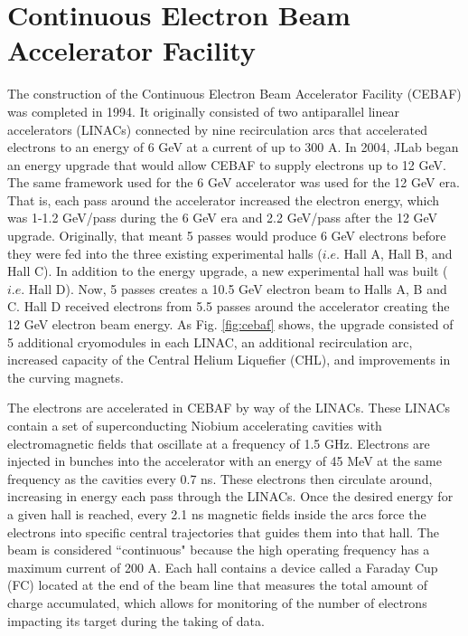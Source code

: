 \section{Continuous Electron Beam Accelerator Facility}
The construction of the Continuous Electron Beam Accelerator Facility (CEBAF) was completed in 1994. It originally consisted of two antiparallel linear accelerators (LINACs) connected by nine recirculation arcs that accelerated electrons to an energy of 6 GeV at a current of up to 300 \textmu A. In 2004, JLab began an energy upgrade that would allow CEBAF to supply electrons up to 12 GeV. The same framework used for the 6 GeV accelerator was used for the 12 GeV era. That is, each pass around the accelerator increased the electron energy, which was 1-1.2 GeV/pass during the 6 GeV era \cite{clasnote:CEBAF} and 2.2 GeV/pass after the 12 GeV upgrade. Originally, that meant 5 passes would produce 6 GeV electrons before they were fed into the three existing experimental halls ($i.e.$ Hall A, Hall B, and Hall C). In addition to the energy upgrade, a new experimental hall was built ($i.e.$ Hall D). Now, 5 passes creates a 10.5 GeV electron beam to Halls A, B and C. Hall D received electrons from 5.5 passes around the accelerator creating the 12 GeV electron beam energy. As Fig. \ref{fig:cebaf} shows, the upgrade consisted of 5 additional cryomodules in each LINAC, an additional recirculation arc, increased capacity of the Central Helium Liquefier (CHL), and improvements in the curving magnets.\cite{pres:CEBAF}

The electrons are accelerated in CEBAF by way of the LINACs. These LINACs contain a set of superconducting Niobium accelerating cavities with electromagnetic fields that oscillate at a frequency of 1.5 GHz. Electrons are injected in bunches into the accelerator with an energy of 45 MeV at the same frequency as the cavities every 0.7 ns.\cite{clasnote:CEBAF} These electrons then circulate around, increasing in energy each pass through the LINACs. Once the desired energy for a given hall is reached, every 2.1 ns magnetic fields inside the arcs force the electrons into specific central trajectories that guides them into that hall. The beam is considered ``continuous" because the high operating frequency has a maximum current of 200 \textmu A. Each hall contains a device called a Faraday Cup (FC) located at the end of the beam line that measures the total amount of charge accumulated, which allows for monitoring of the number of electrons impacting its target during the taking of data.
 

